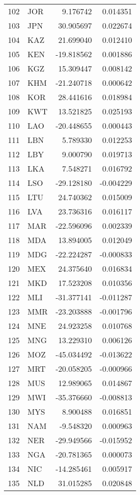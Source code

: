\begin{tabular}{llrr}
102 & JOR & 9.176742 & 0.014351 \\
103 & JPN & 30.905697 & 0.022674 \\
104 & KAZ & 21.699040 & 0.012410 \\
105 & KEN & -19.818562 & 0.001886 \\
106 & KGZ & 15.309447 & 0.008142 \\
107 & KHM & -21.240718 & 0.000642 \\
108 & KOR & 28.441616 & 0.018984 \\
109 & KWT & 13.521825 & 0.025193 \\
110 & LAO & -20.448655 & 0.000443 \\
111 & LBN & 5.789330 & 0.012253 \\
112 & LBY & 9.000790 & 0.019713 \\
113 & LKA & 7.548271 & 0.016792 \\
114 & LSO & -29.128180 & -0.004229 \\
115 & LTU & 24.740362 & 0.015009 \\
116 & LVA & 23.736316 & 0.016117 \\
117 & MAR & -22.596096 & 0.002339 \\
118 & MDA & 13.894005 & 0.012049 \\
119 & MDG & -22.224287 & -0.000833 \\
120 & MEX & 24.375640 & 0.016834 \\
121 & MKD & 17.523208 & 0.010356 \\
122 & MLI & -31.377141 & -0.011287 \\
123 & MMR & -23.203888 & -0.001796 \\
124 & MNE & 24.923258 & 0.010768 \\
125 & MNG & 13.229310 & 0.006126 \\
126 & MOZ & -45.034492 & -0.013622 \\
127 & MRT & -20.058205 & -0.000966 \\
128 & MUS & 12.989065 & 0.014867 \\
129 & MWI & -35.376660 & -0.008813 \\
130 & MYS & 8.900488 & 0.016851 \\
131 & NAM & -9.548320 & 0.000963 \\
132 & NER & -29.949566 & -0.015952 \\
133 & NGA & -20.781365 & 0.000073 \\
134 & NIC & -14.285461 & 0.005917 \\
135 & NLD & 31.015285 & 0.020848 \\

\end{tabular}
